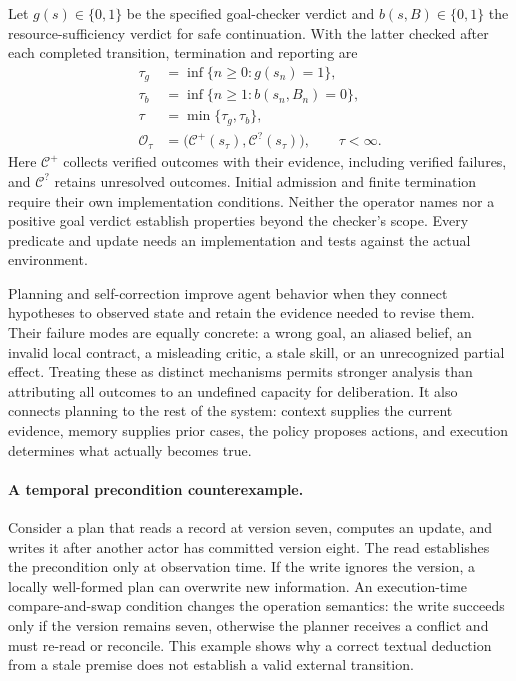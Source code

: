 Let $g(s)\in\{0,1\}$ be the specified goal-checker verdict and $b(s,B)\in\{0,1\}$ the resource-sufficiency verdict for safe continuation. With the latter checked after each completed transition, termination and reporting are
\begin{equation}
\begin{aligned}
 \tau_g&=\inf\{n\geq0:g(s_n)=1\},\\
 \tau_b&=\inf\{n\geq1:b(s_n,B_n)=0\},\\
 \tau&=\min\{\tau_g,\tau_b\},\\
 \mathcal O_\tau
   &=\bigl(\mathcal C^+(s_\tau),\mathcal C^?(s_\tau)\bigr),
   \qquad \tau<\infty.
\end{aligned}
\label{eq:C10:plan-stop-report}
\end{equation}
Here $\mathcal C^+$ collects verified outcomes with their evidence, including verified failures, and $\mathcal C^?$ retains unresolved outcomes. Initial admission and finite termination require their own implementation conditions. Neither the operator names nor a positive goal verdict establish properties beyond the checker's scope. Every predicate and update needs an implementation and tests against the actual environment.

Planning and self-correction improve agent behavior when they connect hypotheses to observed state and retain the evidence needed to revise them. Their failure modes are equally concrete: a wrong goal, an aliased belief, an invalid local contract, a misleading critic, a stale skill, or an unrecognized partial effect. Treating these as distinct mechanisms permits stronger analysis than attributing all outcomes to an undefined capacity for deliberation. It also connects planning to the rest of the system: context supplies the current evidence, memory supplies prior cases, the policy proposes actions, and execution determines what actually becomes true.

\paragraph{A temporal precondition counterexample.}
Consider a plan that reads a record at version seven, computes an update, and writes it after another actor has committed version eight. The read establishes the precondition only at observation time. If the write ignores the version, a locally well-formed plan can overwrite new information. An execution-time compare-and-swap condition changes the operation semantics: the write succeeds only if the version remains seven, otherwise the planner receives a conflict and must re-read or reconcile. This example shows why a correct textual deduction from a stale premise does not establish a valid external transition.

